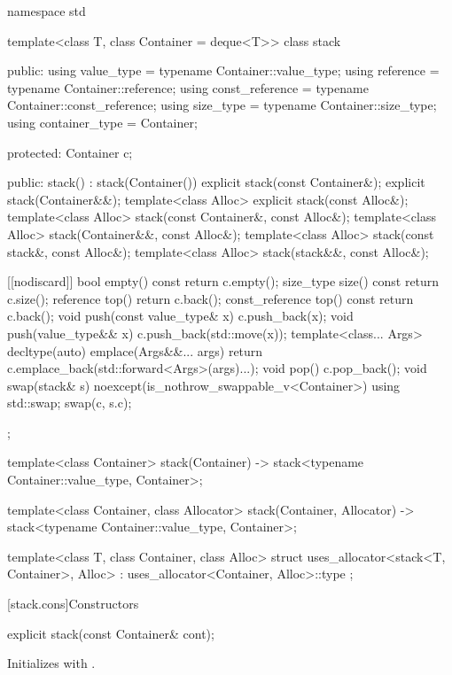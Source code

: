 \begin{codeblock}
namespace std {
  template<class T, class Container = deque<T>>
  class stack {
  public:
    using value_type      = typename Container::value_type;
    using reference       = typename Container::reference;
    using const_reference = typename Container::const_reference;
    using size_type       = typename Container::size_type;
    using container_type  = Container;

  protected:
    Container c;

  public:
    stack() : stack(Container()) {}
    explicit stack(const Container&);
    explicit stack(Container&&);
    template<class Alloc> explicit stack(const Alloc&);
    template<class Alloc> stack(const Container&, const Alloc&);
    template<class Alloc> stack(Container&&, const Alloc&);
    template<class Alloc> stack(const stack&, const Alloc&);
    template<class Alloc> stack(stack&&, const Alloc&);

    [[nodiscard]] bool empty() const    { return c.empty(); }
    size_type size()  const             { return c.size(); }
    reference         top()             { return c.back(); }
    const_reference   top() const       { return c.back(); }
    void push(const value_type& x)      { c.push_back(x); }
    void push(value_type&& x)           { c.push_back(std::move(x)); }
    template<class... Args>
      decltype(auto) emplace(Args&&... args)
        { return c.emplace_back(std::forward<Args>(args)...); }
    void pop()                          { c.pop_back(); }
    void swap(stack& s) noexcept(is_nothrow_swappable_v<Container>)
      { using std::swap; swap(c, s.c); }
  };

  template<class Container>
    stack(Container) -> stack<typename Container::value_type, Container>;

  template<class Container, class Allocator>
    stack(Container, Allocator) -> stack<typename Container::value_type, Container>;

  template<class T, class Container, class Alloc>
    struct uses_allocator<stack<T, Container>, Alloc>
      : uses_allocator<Container, Alloc>::type { };
}
\end{codeblock}

[stack.cons]{Constructors}

%
\begin{itemdecl}
explicit stack(const Container& cont);
\end{itemdecl}

\begin{itemdescr}
\pnum
\effects
Initializes  with .
\end{itemdescr}

